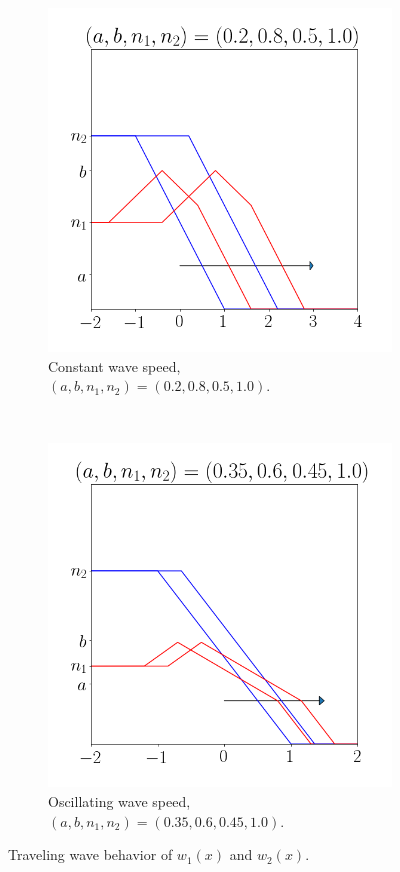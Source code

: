 \documentclass[11pt]{article}
\numberwithin{equation}{section}
\theoremstyle{definition}
\begin{document}
\begin{figure}
    \centering
    \begin{subfigure}[t]{0.5\textwidth}
        \centering
        \includegraphics[scale=0.25]{fig3a}
        \caption{Constant wave speed, \newline $(a,b,n_1,n_2)=(0.2,0.8,0.5,1.0)$.}
    \end{subfigure}%
    ~ 
    \begin{subfigure}[t]{0.5\textwidth}
        \centering
        \includegraphics[scale=0.25]{fig3b}
        \caption{Oscillating wave speed, \newline $(a,b,n_1,n_2)=(0.35,0.6,0.45,1.0)$.}
    \end{subfigure}
    \caption{Traveling wave behavior of $w_1(x)$ and $w_2(x)$.}
    \label{fig:wavespeed}
\end{figure}
\end{document}
